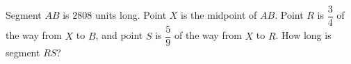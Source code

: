 Segment $AB$ is $2808$ units long. Point $X$ is the midpoint of $AB$. Point $R$ is $\dfrac34$ of the way from $X$ to $B$, and point $S$ is $\dfrac59$ of the way from $X$ to $R$. How long is segment $RS$?

